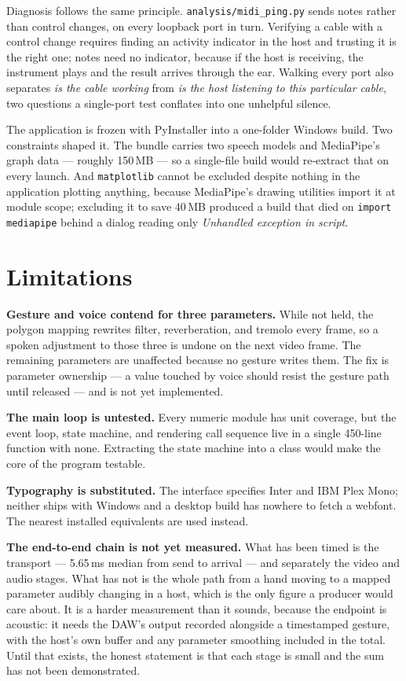 \documentclass[a4paper,10pt,twocolumn]{article}
\newcommand{\code}[1]{\texttt{\small #1}}
\begin{document}
Diagnosis follows the same principle. \code{analysis/midi\_ping.py} sends notes
rather than control changes, on every loopback port in turn. Verifying a cable
with a control change requires finding an activity indicator in the host and
trusting it is the right one; notes need no indicator, because if the host is
receiving, the instrument plays and the result arrives through the ear. Walking
every port also separates \emph{is the cable working} from \emph{is the host
listening to this particular cable}, two questions a single-port test conflates
into one unhelpful silence.

The application is frozen with PyInstaller into a one-folder Windows build.
Two constraints shaped it. The bundle carries two speech models and MediaPipe's
graph data --- roughly 150\,MB --- so a single-file build would re-extract that
on every launch. And \code{matplotlib} cannot be excluded despite nothing in the
application plotting anything, because MediaPipe's drawing utilities import it
at module scope; excluding it to save 40\,MB produced a build that died on
\code{import mediapipe} behind a dialog reading only \emph{Unhandled exception
in script}.

\section{Limitations}

\textbf{Gesture and voice contend for three parameters.} While not held, the
polygon mapping rewrites filter, reverberation, and tremolo every frame, so a
spoken adjustment to those three is undone on the next video frame. The
remaining parameters are unaffected because no gesture writes them. The fix is
parameter ownership --- a value touched by voice should resist the gesture path
until released --- and is not yet implemented.

\textbf{The main loop is untested.} Every numeric module has unit coverage, but
the event loop, state machine, and rendering call sequence live in a single
450-line function with none. Extracting the state machine into a class would
make the core of the program testable.

\textbf{Typography is substituted.} The interface specifies Inter and IBM Plex
Mono; neither ships with Windows and a desktop build has nowhere to fetch a
webfont. The nearest installed equivalents are used instead.

\textbf{The end-to-end chain is not yet measured.} What has been timed is the
transport --- 5.65\,ms median from send to arrival --- and separately the video
and audio stages. What has not is the whole path from a hand moving to a mapped
parameter audibly changing in a host, which is the only figure a producer would
care about. It is a harder measurement than it sounds, because the endpoint is
acoustic: it needs the DAW's output recorded alongside a timestamped gesture,
with the host's own buffer and any parameter smoothing included in the total.
Until that exists, the honest statement is that each stage is small and the sum
has not been demonstrated.
\end{document}
